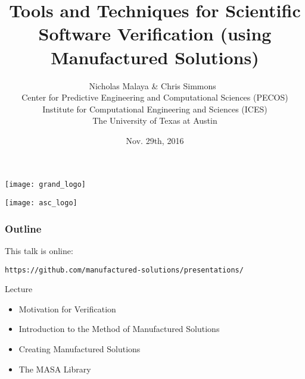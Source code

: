 \documentclass[mathserif]{beamer}
\date{Nov. 29th, 2016}
\author[Nicholas Malaya]{Nicholas Malaya \& Chris Simmons
$~$ \\
{\small
Center for Predictive Engineering and Computational Sciences (PECOS) \\
Institute for Computational Engineering and Sciences (ICES) \\
The University of Texas at Austin
}
}
\title[Software Verification]{Tools and Techniques for Scientific Software Verification
(using Manufactured Solutions)}
\begin{document}
\renewcommand{\inserttotalframenumber}{53}

\begin{frame}
  \begin{center}
    \texttt{[image: grand\_logo]}\\
  \end{center}
  \titlepage
  \begin{flushright}
    \texttt{[image: asc\_logo]}\\
  \end{flushright}
\end{frame}

\begin{frame}[fragile]
  \frametitle{Outline}

  This talk is online:
\begin{verbatim}https://github.com/manufactured-solutions/presentations/\end{verbatim}
  
  \begin{block}{Lecture}
    \begin{itemize}
    \item Motivation for Verification
    \item Introduction to the Method of Manufactured Solutions
    \item Creating Manufactured Solutions
    \item The MASA Library
    \end{itemize}
  \end{block}


\end{frame}
\end{document}
